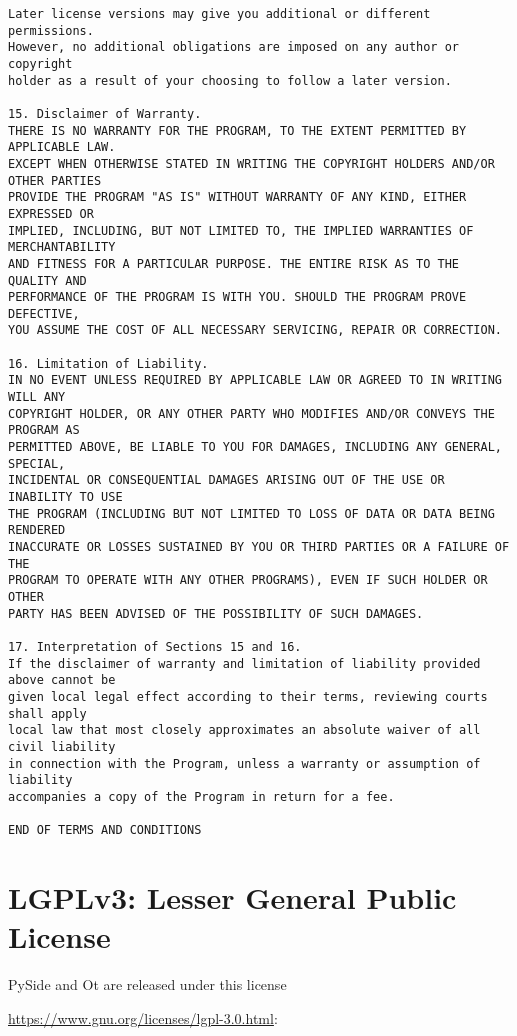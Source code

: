 \begin{verbatim}
Later license versions may give you additional or different permissions.
However, no additional obligations are imposed on any author or copyright
holder as a result of your choosing to follow a later version.

15. Disclaimer of Warranty.
THERE IS NO WARRANTY FOR THE PROGRAM, TO THE EXTENT PERMITTED BY APPLICABLE LAW.
EXCEPT WHEN OTHERWISE STATED IN WRITING THE COPYRIGHT HOLDERS AND/OR OTHER PARTIES
PROVIDE THE PROGRAM "AS IS" WITHOUT WARRANTY OF ANY KIND, EITHER EXPRESSED OR
IMPLIED, INCLUDING, BUT NOT LIMITED TO, THE IMPLIED WARRANTIES OF MERCHANTABILITY
AND FITNESS FOR A PARTICULAR PURPOSE. THE ENTIRE RISK AS TO THE QUALITY AND
PERFORMANCE OF THE PROGRAM IS WITH YOU. SHOULD THE PROGRAM PROVE DEFECTIVE,
YOU ASSUME THE COST OF ALL NECESSARY SERVICING, REPAIR OR CORRECTION.

16. Limitation of Liability.
IN NO EVENT UNLESS REQUIRED BY APPLICABLE LAW OR AGREED TO IN WRITING WILL ANY
COPYRIGHT HOLDER, OR ANY OTHER PARTY WHO MODIFIES AND/OR CONVEYS THE PROGRAM AS
PERMITTED ABOVE, BE LIABLE TO YOU FOR DAMAGES, INCLUDING ANY GENERAL, SPECIAL,
INCIDENTAL OR CONSEQUENTIAL DAMAGES ARISING OUT OF THE USE OR INABILITY TO USE
THE PROGRAM (INCLUDING BUT NOT LIMITED TO LOSS OF DATA OR DATA BEING RENDERED
INACCURATE OR LOSSES SUSTAINED BY YOU OR THIRD PARTIES OR A FAILURE OF THE
PROGRAM TO OPERATE WITH ANY OTHER PROGRAMS), EVEN IF SUCH HOLDER OR OTHER
PARTY HAS BEEN ADVISED OF THE POSSIBILITY OF SUCH DAMAGES.

17. Interpretation of Sections 15 and 16.
If the disclaimer of warranty and limitation of liability provided above cannot be
given local legal effect according to their terms, reviewing courts shall apply
local law that most closely approximates an absolute waiver of all civil liability
in connection with the Program, unless a warranty or assumption of liability
accompanies a copy of the Program in return for a fee.

END OF TERMS AND CONDITIONS

\end{verbatim}
\normalsize
\section{LGPLv3: Lesser General Public License}

PySide and Ot are released under this license

\url{https://www.gnu.org/licenses/lgpl-3.0.html}:
\scriptsize

